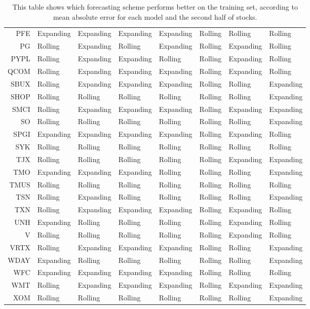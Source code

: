\begin{table}[ht]
\begin{tabular}{rlllllll}
  PFE & Expanding & Expanding & Expanding & Expanding & Rolling & Rolling & Rolling \\ 
  PG & Rolling & Expanding & Rolling & Expanding & Rolling & Expanding & Rolling \\ 
  PYPL & Rolling & Expanding & Expanding & Rolling & Rolling & Expanding & Rolling \\ 
  QCOM & Rolling & Expanding & Expanding & Expanding & Rolling & Expanding & Rolling \\ 
  SBUX & Rolling & Expanding & Expanding & Expanding & Rolling & Rolling & Expanding \\ 
  SHOP & Rolling & Rolling & Rolling & Rolling & Rolling & Rolling & Expanding \\ 
  SMCI & Rolling & Expanding & Expanding & Expanding & Rolling & Expanding & Expanding \\ 
  SO & Rolling & Rolling & Rolling & Rolling & Rolling & Rolling & Expanding \\ 
  SPGI & Expanding & Expanding & Expanding & Expanding & Rolling & Expanding & Rolling \\ 
  SYK & Rolling & Rolling & Rolling & Rolling & Rolling & Rolling & Rolling \\ 
  TJX & Rolling & Rolling & Rolling & Rolling & Rolling & Expanding & Expanding \\ 
  TMO & Expanding & Expanding & Expanding & Rolling & Rolling & Rolling & Expanding \\ 
  TMUS & Rolling & Rolling & Rolling & Rolling & Rolling & Rolling & Rolling \\ 
  TSN & Rolling & Expanding & Rolling & Rolling & Rolling & Rolling & Expanding \\ 
  TXN & Rolling & Expanding & Expanding & Expanding & Rolling & Expanding & Rolling \\ 
  UNH & Expanding & Rolling & Rolling & Rolling & Rolling & Expanding & Rolling \\ 
  V & Rolling & Rolling & Rolling & Rolling & Rolling & Expanding & Rolling \\ 
  VRTX & Rolling & Expanding & Expanding & Expanding & Rolling & Rolling & Expanding \\ 
  WDAY & Expanding & Rolling & Rolling & Rolling & Rolling & Rolling & Expanding \\ 
  WFC & Expanding & Expanding & Expanding & Expanding & Rolling & Rolling & Rolling \\ 
  WMT & Rolling & Expanding & Expanding & Expanding & Rolling & Expanding & Expanding \\ 
  XOM & Rolling & Rolling & Rolling & Rolling & Rolling & Rolling & Expanding \\ 
   \hline
\end{tabular}
\caption[Better scheme MAE (2)]{This table shows which forecasting scheme performs better on the training set, according to mean absolute error
              for each model and the second half of stocks.} 
\label{Table:Better_MAE_2}
\end{table}
